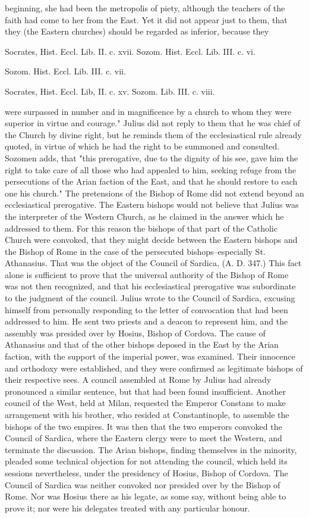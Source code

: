 beginning, she had been the metropolis of piety, although the teachers of the faith had come to her from the East. Yet it did not appear just to them, that they (the Eastern churches) should be regarded as inferior, because they

Socrates, Hist. Eccl. Lib. II. c. xvii. Sozom. Hist. Eccl. Lib. III. c. vi.

Sozom. Hist. Eccl. Lib. III. c. vii.

Socrates, Hist. Eccl. Lib, II. c. xv. Sozom. Lib. III. c. viii.

were surpassed in number and in magnificence by a church to whom they were superior in virtue and courage." Julius did not reply to them that he was chief of the Church by divine right, but he reminds them of the ecclesiastical rule already quoted, in virtue of which he had the right to be summoned and consulted. Sozomen adds, that "this prerogative, due to the dignity of his see, gave him the right to take care of all those who had appealed to him, seeking refuge from the persecutions of the Arian faction of the East, and that he should restore to each one his church." The pretensions of the Bishop of Rome did not extend beyond an ecclesiastical prerogative. The Eastern bishops would not believe that Julius was the interpreter of the Western Church, as he claimed in the answer which he addressed to them. For this reason the bishops of that part of the Catholic Church were convoked, that they might decide between the Eastern bishops and the Bishop of Rome in the case of the persecuted bishops--especially St. Athanasius. That was the object of the Council of Sardica, (A. D. 347.) This fact alone is sufficient to prove that the universal authority of the Bishop of Rome was not then recognized, and that his ecclesiastical prerogative was subordinate to the judgment of the council. Julius wrote to the Council of Sardica, excusing himself from personally responding to the letter of convocation that had been addressed to him. He sent two priests and a deacon to represent him, and the assembly was presided over by Hosius, Bishop of Cordova. The cause of Athanasius and that of the other bishops deposed in the East by the Arian faction, with the support of the imperial power, was examined. Their innocence and orthodoxy were established, and they were confirmed as legitimate bishops of their respective sees. A council assembled at Rome by Julius had already pronounced a similar sentence, but that had been found insufficient. Another council of the West, held at Milan, requested the Emperor Constans to make arrangement with his brother, who resided at Constantinople, to assemble the bishops of the two empires. It was then that the two emperors convoked the Council of Sardica, where the Eastern clergy were to meet the Western, and terminate the discussion. The Arian bishops, finding themselves in the minority, pleaded some technical objection for not attending the council, which held its sessions nevertheless, under the presidency of Hosius, Bishop of Cordova. The Council of Sardica was neither convoked nor presided over by the Bishop of Rome. Nor was Hosius there as his legate, as some say, without being able to prove it; nor were his delegates treated with any particular honour. 